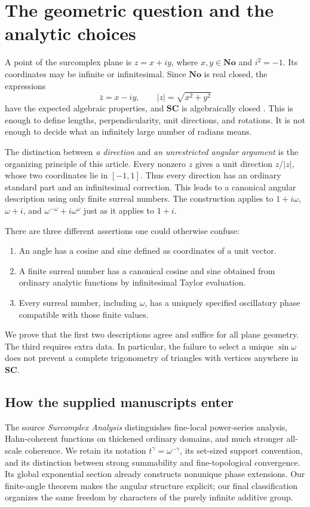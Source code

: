 \documentclass[11pt,letterpaper]{article}
\theoremstyle{definition}
\theoremstyle{remark}
\newcommand{\No}{\mathbf{No}}
\newcommand{\SC}{\mathbf{SC}}
\numberwithin{equation}{section}
\begin{document}
\tableofcontents
\clearpage

\section{The geometric question and the analytic choices}\label{sec:intro}
A point of the surcomplex plane is $z=x+iy$, where $x,y\in\No$ and $i^2=-1$. Its coordinates may be infinite or infinitesimal. Since $\No$ is real closed, the expressions
\[
 \bar z=x-iy,\qquad |z|=\sqrt{x^2+y^2}
\]
have the expected algebraic properties, and $\SC$ is algebraically closed \cite{Conway,Gonshor,vdDE}. This is enough to define lengths, perpendicularity, unit directions, and rotations. It is not enough to decide what an infinitely large number of radians means.

The distinction between \emph{a direction} and \emph{an unrestricted angular argument} is the organizing principle of this article. Every nonzero $z$ gives a unit direction $z/|z|$, whose two coordinates lie in $[-1,1]$. Thus every direction has an ordinary standard part and an infinitesimal correction. This leads to a canonical angular description using only finite surreal numbers. The construction applies to $1+i\omega$, $\omega+i$, and $\omega^{-\omega}+i\omega^{\omega}$ just as it applies to $1+i$.

There are three different assertions one could otherwise confuse:
\begin{enumerate}
\item An angle has a cosine and sine defined as coordinates of a unit vector.
\item A finite surreal number has a canonical cosine and sine obtained from ordinary analytic functions by infinitesimal Taylor evaluation.
\item Every surreal number, including $\omega$, has a uniquely specified oscillatory phase compatible with those finite values.
\end{enumerate}
We prove that the first two descriptions agree and suffice for all plane geometry. The third requires extra data. In particular, the failure to select a unique $\sin\omega$ does not prevent a complete trigonometry of triangles with vertices anywhere in $\SC$.

\subsection{How the supplied manuscripts enter}
The source \emph{Surcomplex Analysis} \cite{SourceAnalysis} distinguishes fine-local power-series analysis, Hahn-coherent functions on thickened ordinary domains, and much stronger all-scale coherence. We retain its notation $t^\gamma=\omega^{-\gamma}$, its set-sized support convention, and its distinction between strong summability and fine-topological convergence. Its global exponential section already constructs nonunique phase extensions. Our finite-angle theorem makes the angular structure explicit; our final classification organizes the same freedom by characters of the purely infinite additive group.
\end{document}
